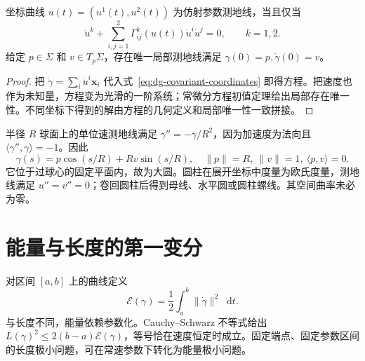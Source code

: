 \documentclass[UTF8,12pt,a4paper,fontset=fandol]{ctexbook}
\newcommand{\dd}{\mathop{}\!\mathrm d}
\newcommand{\ip}[2]{\langle #1,#2\rangle}
\newcommand{\norm}[1]{\lVert #1\rVert}
\begin{document}
\begin{theorem}[坐标方程与局部存在唯一性]
坐标曲线 $u(t)=(u^1(t),u^2(t))$ 为仿射参数测地线，当且仅当
\begin{equation}
 \ddot u^k+\sum_{i,j=1}^2\Gamma^k_{ij}(u(t))\dot u^i\dot u^j=0,
 \qquad k=1,2.
 \label{eq:dg-geodesic-equations}
\end{equation}
给定 $p\in\Sigma$ 和 $v\in T_p\Sigma$，存在唯一局部测地线满足 $\gamma(0)=p,\dot\gamma(0)=v$。
\end{theorem}
\begin{proof}
把 $\dot\gamma=\sum_i\dot u^i\mathbf x_i$ 代入式~\eqref{eq:dg-covariant-coordinates} 即得方程。把速度也作为未知量，方程变为光滑的一阶系统；常微分方程初值定理给出局部存在唯一性。不同坐标下得到的解由方程的几何定义和局部唯一性一致拼接。
\end{proof}

\begin{example}[球面与圆柱上的测地线]
半径 $R$ 球面上的单位速测地线满足 $\gamma''=-\gamma/R^2$，因为加速度为法向且 $\ip{\gamma''}\gamma=-1$。因此
\[
 \gamma(s)=p\cos(s/R)+Rv\sin(s/R),\quad
 \norm p=R,\ \norm v=1,\ \ip pv=0.
\]
它位于过球心的固定平面内，故为大圆。圆柱在展开坐标中度量为欧氏度量，测地线满足 $u''=v''=0$；卷回圆柱后得到母线、水平圆或圆柱螺线。其空间曲率未必为零。
\end{example}

\section{能量与长度的第一变分}
对区间 $[a,b]$ 上的曲线定义
\[
 \mathcal E(\gamma)=\frac12\int_a^b\norm{\dot\gamma}^2\dd t.
\]
与长度不同，能量依赖参数化。Cauchy--Schwarz 不等式给出 $L(\gamma)^2\le2(b-a)\mathcal E(\gamma)$，等号恰在速度恒定时成立。固定端点、固定参数区间的长度极小问题，可在常速参数下转化为能量极小问题。
\end{document}
